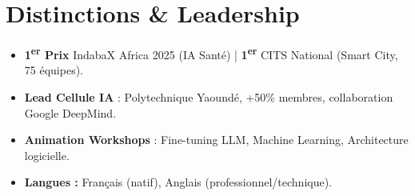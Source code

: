 \documentclass[a4paper,11pt]{article}
\begin{document}
\section{Distinctions \& Leadership}
\begin{itemize}[leftmargin=*, label=\tiny$\bullet$, nosep]
    \item \textbf{1\textsuperscript{er} Prix} IndabaX Africa 2025 (IA Santé) | \textbf{1\textsuperscript{er}} CITS National (Smart City, 75 équipes).
    \item \textbf{Lead Cellule IA} : Polytechnique Yaoundé, +50\% membres, collaboration Google DeepMind.
    \item \textbf{Animation Workshops} : Fine-tuning LLM, Machine Learning, Architecture logicielle.
    \item \textbf{Langues :} Français (natif), Anglais (professionnel/technique).
\end{itemize}
\end{document}
